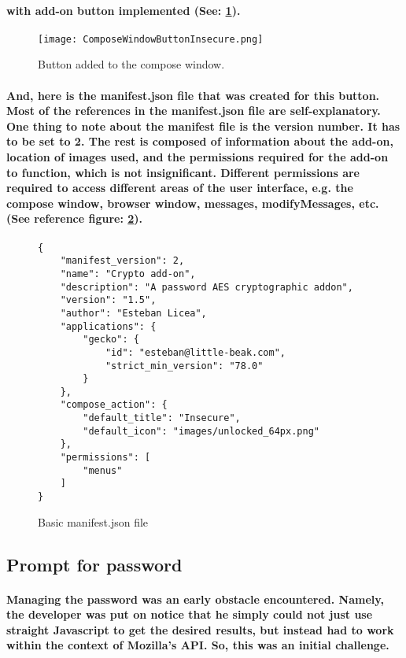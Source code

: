 \paragraph{with add-on button implemented (See: \ref{fig: withButton}).}

\begin{figure}[H]
    \centering
    \texttt{[image: ComposeWindowButtonInsecure.png]}
    \caption{\label{fig: withButton} Button added to the compose window.}
\end{figure}

\paragraph{And, here is the manifest.json file that was created for this button. Most of the references in the manifest.json file are self-explanatory. One thing to note about the manifest file is the version number. It has to be set to 2. The rest is composed of information about the add-on, location of images used, and the permissions required for the add-on to function, which is not insignificant. Different permissions are required to access different areas of the user interface, e.g. the compose window, browser window, messages, modifyMessages, etc. (See reference figure: \ref{fig: basic_manifest.json}).}

\begin{figure}[H]
\centering
\begin{verbatim}
{
    "manifest_version": 2,
    "name": "Crypto add-on",
    "description": "A password AES cryptographic addon",
    "version": "1.5",
    "author": "Esteban Licea",
    "applications": {
        "gecko": {
            "id": "esteban@little-beak.com",
            "strict_min_version": "78.0"
        }
    },
    "compose_action": {
        "default_title": "Insecure",
        "default_icon": "images/unlocked_64px.png"
    },
    "permissions": [
        "menus"
    ]
}
\end{verbatim}
\caption{\label{fig: basic_manifest.json} Basic manifest.json file}
\end{figure}

\subsection{Prompt for password}

\paragraph{Managing the password was an early obstacle encountered. Namely, the developer was put on notice that he simply could not just use straight Javascript to get the desired results, but instead had to work within the context of Mozilla's API. So, this was an initial challenge.}


